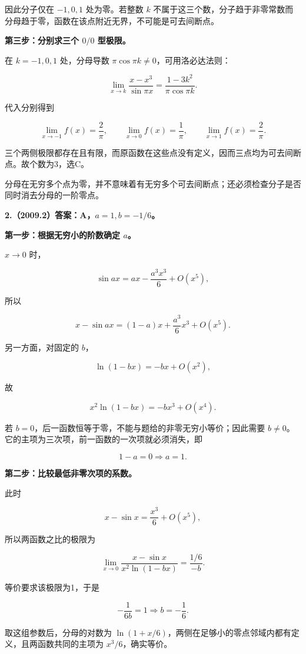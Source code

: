 \documentclass[UTF8,11pt,fontset=windows]{ctexart}
\begin{document}
因此分子仅在 $-1,0,1$ 处为零。若整数 $k$ 不属于这三个数，分子趋于非零常数而分母趋于零，函数在该点附近无界，不可能是可去间断点。

\textbf{第三步：分别求三个 $0/0$ 型极限。}

在 $k=-1,0,1$ 处，分母导数 $\pi\cos\pi k\ne0$，可用洛必达法则：

$$
\lim_{x\to k}\frac{x-x^3}{\sin\pi x}
=\frac{1-3k^2}{\pi\cos\pi k}.
$$

代入分别得到

$$
\lim_{x\to-1}f(x)=\frac2\pi,
\qquad\lim_{x\to0}f(x)=\frac1\pi,
\qquad\lim_{x\to1}f(x)=\frac2\pi.
$$

三个两侧极限都存在且有限，而原函数在这些点没有定义，因而三点均为可去间断点。故个数为3，选C。

分母在无穷多个点为零，并不意味着有无穷多个可去间断点；还必须检查分子是否同时消去分母的一阶零点。

\clearpage

\textbf{2.（2009.2）答案：A，$a=1,b=-1/6$。}

\textbf{第一步：根据无穷小的阶数确定 $a$。}

$x\to0$ 时，

$$
\sin ax=ax-\frac{a^3x^3}{6}+O(x^5),
$$

所以

$$
x-\sin ax=(1-a)x+\frac{a^3}{6}x^3+O(x^5).
$$

另一方面，对固定的 $b$，

$$
\ln(1-bx)=-bx+O(x^2),
$$

故

$$
x^2\ln(1-bx)=-bx^3+O(x^4).
$$

若 $b=0$，后一函数恒等于零，不能与题给的非零无穷小等价；因此需要 $b\ne0$。它的主项为三次项，前一函数的一次项就必须消失，即

$$
1-a=0\Longrightarrow a=1.
$$

\textbf{第二步：比较最低非零次项的系数。}

此时

$$
x-\sin x=\frac{x^3}{6}+O(x^5),
$$

所以两函数之比的极限为

$$
\lim_{x\to0}\frac{x-\sin x}{x^2\ln(1-bx)}
=\frac{1/6}{-b}.
$$

等价要求该极限为1，于是

$$
-\frac1{6b}=1\Longrightarrow\boxed{b=-\frac16}.
$$

取这组参数后，分母的对数为 $\ln(1+x/6)$，两侧在足够小的零点邻域内都有定义，且两函数共同的主项为 $x^3/6$，确实等价。
\end{document}
